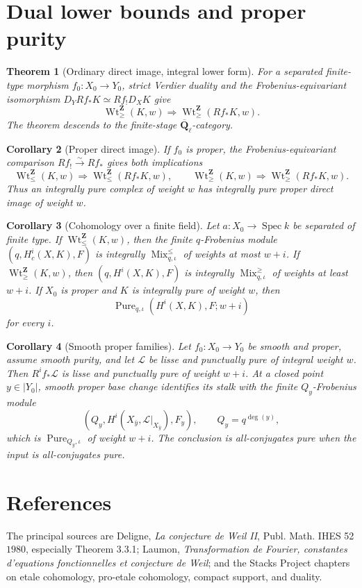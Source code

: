 \documentclass[10pt]{article}
\newtheorem{theorem}{Theorem}[section]
\newtheorem{corollary}[theorem]{Corollary}
\theoremstyle{definition}
\newcommand{\Qlb}{\overline{\mathbf Q}_\ell}
\newcommand{\IntWtLe}{\operatorname{Wt}^{\mathbf Z}_{\leq}}
\newcommand{\IntWtGe}{\operatorname{Wt}^{\mathbf Z}_{\geq}}
\newcommand{\MixLe}{\operatorname{Mix}^{\leq}}
\newcommand{\MixGe}{\operatorname{Mix}^{\geq}}
\newcommand{\Pure}{\operatorname{Pure}}
\newcommand{\Spec}{\operatorname{Spec}}
\begin{document}
\section{Dual lower bounds and proper purity}

\begin{theorem}[Ordinary direct image, integral lower form]
For a separated finite-type morphism \(f_0:X_0\to Y_0\), strict Verdier
duality and the Frobenius-equivariant isomorphism
\(D_YRf_*K\simeq Rf_!D_XK\) give
\[
 \boxed{\qquad
 \IntWtGe(K,w)\Longrightarrow\IntWtGe(Rf_*K,w).
 \qquad}
\]
The theorem descends to the finite-stage \(\Qlb\)-category.
\end{theorem}

\begin{corollary}[Proper direct image]
If \(f_0\) is proper, the Frobenius-equivariant comparison
\(Rf_!\xrightarrow{\sim}Rf_*\) gives both implications
\[
 \IntWtLe(K,w)\Longrightarrow\IntWtLe(Rf_*K,w),
 \qquad
 \IntWtGe(K,w)\Longrightarrow\IntWtGe(Rf_*K,w).
\]
Thus an integrally pure complex of weight \(w\) has integrally pure proper
direct image of weight \(w\).
\end{corollary}

\begin{corollary}[Cohomology over a finite field]
Let \(a:X_0\to\Spec k\) be separated of finite type.  If
\(\IntWtLe(K,w)\), then the finite \(q\)-Frobenius module
\((q,H_c^i(X,K),F)\) is integrally
\(\MixLe_{q,\iota}\) of weights at most \(w+i\).  If
\(\IntWtGe(K,w)\), then
\((q,H^i(X,K),F)\) is integrally
\(\MixGe_{q,\iota}\) of weights at least \(w+i\).  If \(X_0\) is proper
and \(K\) is integrally pure of weight \(w\), then
\[
               \Pure_{q,\iota}(H^i(X,K),F;w+i)
\]
for every \(i\).
\end{corollary}

\begin{corollary}[Smooth proper families]
Let \(f_0:X_0\to Y_0\) be smooth and proper, assume smooth purity, and let
\(\mathcal L\) be lisse and
punctually pure of integral weight \(w\).  Then \(R^if_*\mathcal L\) is
lisse and punctually pure of weight \(w+i\).  At a closed point
\(y\in|Y_0|\), smooth proper base change identifies its stalk with the
finite \(Q_y\)-Frobenius module
\[
 (Q_y,H^i(X_{\bar y},\mathcal L|_{X_{\bar y}}),F_y),
 \qquad Q_y=q^{\deg(y)},
\]
which is \(\Pure_{Q_y,\iota}\) of weight \(w+i\).  The conclusion is
all-conjugates pure when the input is all-conjugates pure.
\end{corollary}

\section{References}

The principal sources are Deligne, \emph{La conjecture de Weil II},
Publ. Math. IHES 52 \(1980\), especially Theorem 3.3.1; Laumon,
\emph{Transformation de Fourier, constantes d'equations fonctionnelles et
conjecture de Weil}; and the Stacks Project chapters on etale cohomology,
pro-etale cohomology, compact support, and duality.
\end{document}
